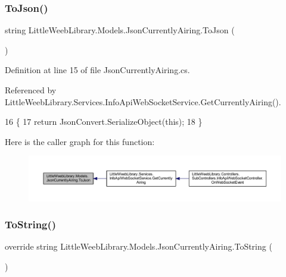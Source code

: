 \subsubsection{\texorpdfstring{To\+Json()}{ToJson()}}
{\footnotesize\ttfamily string Little\+Weeb\+Library.\+Models.\+Json\+Currently\+Airing.\+To\+Json (\begin{DoxyParamCaption}{ }\end{DoxyParamCaption})}



Definition at line 15 of file Json\+Currently\+Airing.\+cs.



Referenced by Little\+Weeb\+Library.\+Services.\+Info\+Api\+Web\+Socket\+Service.\+Get\+Currently\+Airing().


\begin{DoxyCode}
16         \{
17             \textcolor{keywordflow}{return} JsonConvert.SerializeObject(\textcolor{keyword}{this});
18         \}
\end{DoxyCode}
Here is the caller graph for this function\+:\nopagebreak
\begin{figure}[H]
\begin{center}
\leavevmode
\includegraphics[width=350pt]{class_little_weeb_library_1_1_models_1_1_json_currently_airing_a5e56160f130c25bd439904d14b5bdbc4_icgraph}
\end{center}
\end{figure}
\mbox{\label{class_little_weeb_library_1_1_models_1_1_json_currently_airing_a330c337c9e0ddf2866a9a102ae0e9880}} 
\subsubsection{\texorpdfstring{To\+String()}{ToString()}}
{\footnotesize\ttfamily override string Little\+Weeb\+Library.\+Models.\+Json\+Currently\+Airing.\+To\+String (\begin{DoxyParamCaption}{ }\end{DoxyParamCaption})}



